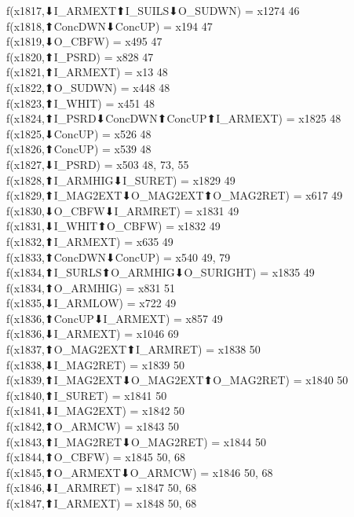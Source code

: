 f(x1817,⬇I_ARMEXT⬆I_SUILS⬇O_SUDWN) = x1274 {46} \\
f(x1818,⬆ConcDWN⬇ConcUP) = x194 {47} \\
f(x1819,⬇O_CBFW) = x495 {47} \\
f(x1820,⬆I_PSRD) = x828 {47} \\
f(x1821,⬆I_ARMEXT) = x13 {48} \\
f(x1822,⬆O_SUDWN) = x448 {48} \\
f(x1823,⬆I_WHIT) = x451 {48} \\
f(x1824,⬆I_PSRD⬇ConcDWN⬆ConcUP⬆I_ARMEXT) = x1825 {48} \\
f(x1825,⬇ConcUP) = x526 {48} \\
f(x1826,⬆ConcUP) = x539 {48} \\
f(x1827,⬇I_PSRD) = x503 {48, 73, 55} \\
f(x1828,⬆I_ARMHIG⬇I_SURET) = x1829 {49} \\
f(x1829,⬆I_MAG2EXT⬇O_MAG2EXT⬆O_MAG2RET) = x617 {49} \\
f(x1830,⬇O_CBFW⬇I_ARMRET) = x1831 {49} \\
f(x1831,⬇I_WHIT⬆O_CBFW) = x1832 {49} \\
f(x1832,⬆I_ARMEXT) = x635 {49} \\
f(x1833,⬆ConcDWN⬇ConcUP) = x540 {49, 79} \\
f(x1834,⬆I_SURLS⬆O_ARMHIG⬇O_SURIGHT) = x1835 {49} \\
f(x1834,⬆O_ARMHIG) = x831 {51} \\
f(x1835,⬇I_ARMLOW) = x722 {49} \\
f(x1836,⬆ConcUP⬇I_ARMEXT) = x857 {49} \\
f(x1836,⬇I_ARMEXT) = x1046 {69} \\
f(x1837,⬆O_MAG2EXT⬆I_ARMRET) = x1838 {50} \\
f(x1838,⬇I_MAG2RET) = x1839 {50} \\
f(x1839,⬆I_MAG2EXT⬇O_MAG2EXT⬆O_MAG2RET) = x1840 {50} \\
f(x1840,⬆I_SURET) = x1841 {50} \\
f(x1841,⬇I_MAG2EXT) = x1842 {50} \\
f(x1842,⬆O_ARMCW) = x1843 {50} \\
f(x1843,⬆I_MAG2RET⬇O_MAG2RET) = x1844 {50} \\
f(x1844,⬆O_CBFW) = x1845 {50, 68} \\
f(x1845,⬆O_ARMEXT⬇O_ARMCW) = x1846 {50, 68} \\
f(x1846,⬇I_ARMRET) = x1847 {50, 68} \\
f(x1847,⬆I_ARMEXT) = x1848 {50, 68} \\

